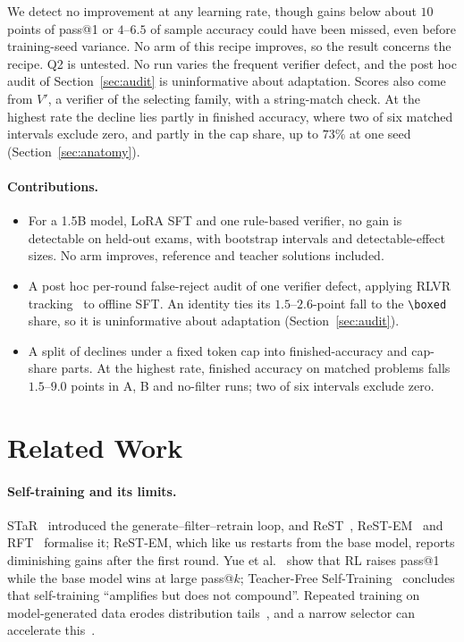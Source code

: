 \documentclass[runningheads]{llncs}
\begin{document}
We detect no improvement at any learning rate, though gains below about $10$
points of pass@1 or $4$--$6.5$ of sample accuracy could have been missed, even
before training-seed variance. No arm of this recipe improves, so the result
concerns the recipe. Q2 is untested. No run varies the frequent verifier defect,
and the post hoc audit of Section~\ref{sec:audit} is uninformative about
adaptation. Scores also come from $V'$, a verifier of the selecting family, with
a string-match check. At the highest rate the decline lies partly in finished
accuracy, where two of six matched intervals exclude zero, and partly in the cap
share, up to $73\%$ at one seed (Section~\ref{sec:anatomy}).

\paragraph{Contributions.}
\begin{itemize}
\item For a 1.5B model, LoRA SFT and one rule-based verifier, no gain is
detectable on held-out exams, with bootstrap intervals and detectable-effect
sizes. No arm improves, reference and teacher solutions included.
\item A post hoc per-round false-reject audit of one verifier defect, applying
RLVR tracking~\cite{ref_delayplateau,ref_tinyv} to offline SFT. An identity ties
its $1.5$--$2.6$-point fall to the \verb|\boxed| share, so it is uninformative
about adaptation (Section~\ref{sec:audit}).
\item A split of declines under a fixed token cap into finished-accuracy and
cap-share parts. At the highest rate, finished accuracy on matched problems falls
$1.5$--$9.0$ points in A, B and no-filter runs; two of six intervals exclude zero.
\end{itemize}

\section{Related Work}
\label{sec:related}

\paragraph{Self-training and its limits.}
STaR~\cite{ref_star} introduced the generate--filter--retrain loop, and
ReST~\cite{ref_rest}, ReST-EM~\cite{ref_restem} and RFT~\cite{ref_rft} formalise
it; ReST-EM, which like us restarts from the base model, reports
diminishing gains after the first round. Yue et al.~\cite{ref_rllimit} show that RL
raises pass@1 while the base model wins at large pass@$k$; Teacher-Free
Self-Training~\cite{ref_teacherfree} concludes that self-training ``amplifies but
does not compound''. Repeated training on model-generated data erodes
distribution tails~\cite{ref_collapse}, and a narrow selector can accelerate
this~\cite{ref_selectionbias}.
\end{document}
